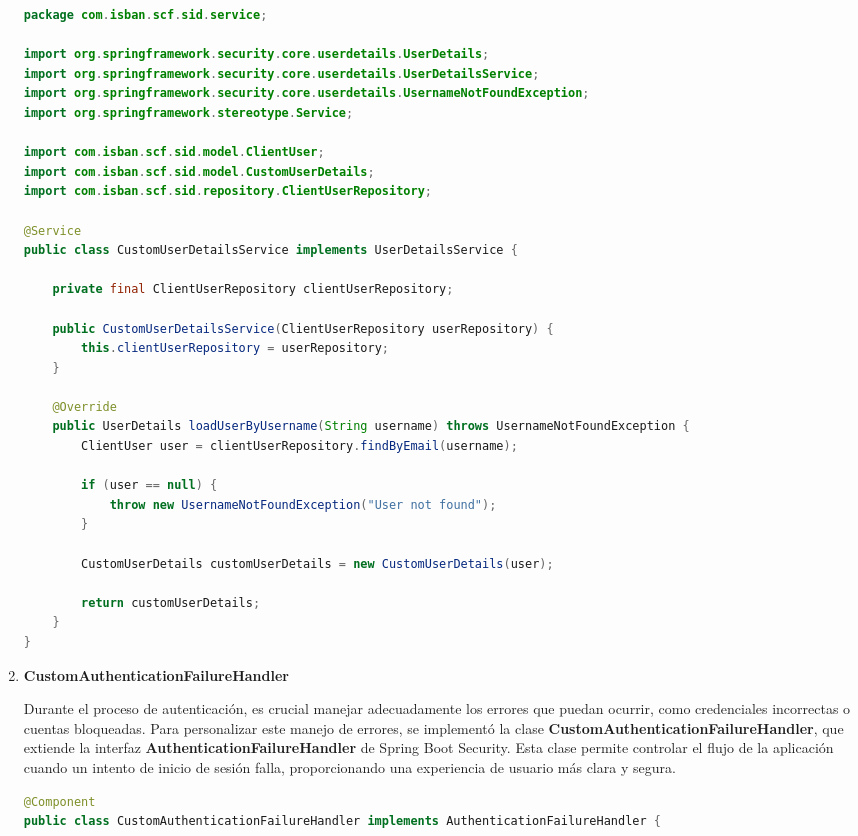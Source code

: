 \documentclass[draft]{scrbook}
\begin{document}
\begin{enumerate}
\begin{lstlisting}[language=Java]
package com.isban.scf.sid.service;

import org.springframework.security.core.userdetails.UserDetails;
import org.springframework.security.core.userdetails.UserDetailsService;
import org.springframework.security.core.userdetails.UsernameNotFoundException;
import org.springframework.stereotype.Service;

import com.isban.scf.sid.model.ClientUser;
import com.isban.scf.sid.model.CustomUserDetails;
import com.isban.scf.sid.repository.ClientUserRepository;

@Service
public class CustomUserDetailsService implements UserDetailsService {

	private final ClientUserRepository clientUserRepository;
	
    public CustomUserDetailsService(ClientUserRepository userRepository) {
        this.clientUserRepository = userRepository;
    }
    
    @Override
    public UserDetails loadUserByUsername(String username) throws UsernameNotFoundException {
        ClientUser user = clientUserRepository.findByEmail(username);
        
        if (user == null) {
            throw new UsernameNotFoundException("User not found");
        }
        
        CustomUserDetails customUserDetails = new CustomUserDetails(user);
        
        return customUserDetails;
    }
}
\end{lstlisting}

    \item \textbf{CustomAuthenticationFailureHandler}

    Durante el proceso de autenticación, es crucial manejar adecuadamente los errores que puedan ocurrir, como credenciales incorrectas o cuentas bloqueadas. Para personalizar este manejo de errores, se implementó la clase \textbf{CustomAuthenticationFailureHandler}, que extiende la interfaz \textbf{AuthenticationFailureHandler} de Spring Boot Security. Esta clase permite controlar el flujo de la aplicación cuando un intento de inicio de sesión falla, proporcionando una experiencia de usuario más clara y segura.

\begin{lstlisting}[language=Java]
@Component
public class CustomAuthenticationFailureHandler implements AuthenticationFailureHandler {


\end{lstlisting}
\end{enumerate}
\end{document}

